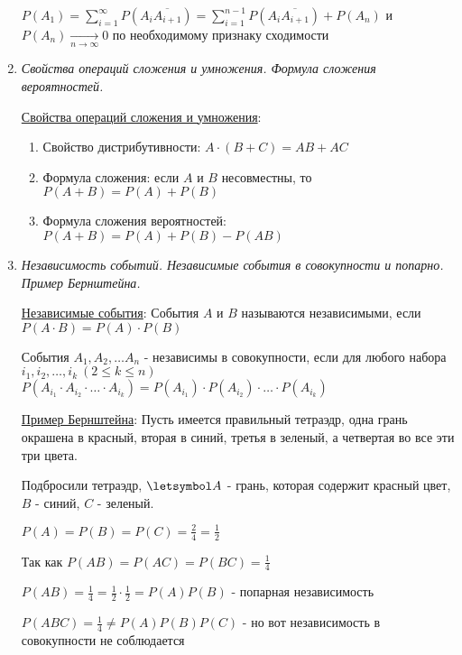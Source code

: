 \begin{enumerate}
\begin{MyProof}
        $P(A_1) = \sum_{i = 1}^\infty P(A_i \overline{A_{i + 1}}) = \sum_{i = 1}^{n - 1} P(A_i \overline{A_{i + 1}}) + P(A_n)$ и $P(A_n) \underset{n \to \infty}{\to} 0$ по необходимому признаку сходимости
    \end{MyProof}

    \item \textit{Свойства операций сложения и умножения. Формула сложения вероятностей.}

    \hyperlink{probabilityoperationsproperties}{Свойства операций сложения и умножения}:

    \begin{enumerate}
        \item Свойство дистрибутивности: $A \cdot (B + C) = AB + AC$

        \item Формула сложения: если $A$ и $B$ несовместны, то $P(A + B) = P(A) + P(B)$

        \item Формула сложения вероятностей: $P(A + B) = P(A) + P(B) - P(AB)$
    \end{enumerate}

    \item \textit{Независимость событий. Независимые события в совокупности и попарно. Пример Бернштейна. }

    \hyperlink{independantevents}{Независимые события}: События $A$ и $B$ называются независимыми, если $P(A \cdot B) = P(A) \cdot P(B)$

    События $A_1, A_2, \dots A_n$ - независимы в совокупности, если для любого набора $i_1, i_2, \dots, i_k \ (2 \leq k \leq n)$
    $P(A_{i_1} \cdot A_{i_2} \cdot \dots \cdot A_{i_k}) = P(A_{i_1}) \cdot P(A_{i_2}) \cdot \dots \cdot P(A_{i_k})$

    \hyperlink{bernshteinsexample}{Пример Бернштейна}: Пусть имеется правильный тетраэдр, одна грань окрашена в красный, вторая в синий, третья в зеленый, а четвертая во все эти три цвета.

    Подбросили тетраэдр, $\letsymbol A$ - грань, которая содержит красный цвет, $B$ - синий, $C$ - зеленый.

    $P(A) = P(B) = P(C) = \frac{2}{4} = \frac{1}{2}$

    Так как $P(AB) = P(AC) = P(BC) = \frac{1}{4}$

    $P(AB) = \frac{1}{4} = \frac{1}{2} \cdot \frac{1}{2} = P(A) P(B)$ - попарная независимость

    $P(ABC) = \frac{1}{4} \neq P(A) P(B) P(C)$ - но вот независимость в совокупности не соблюдается


\end{enumerate}
